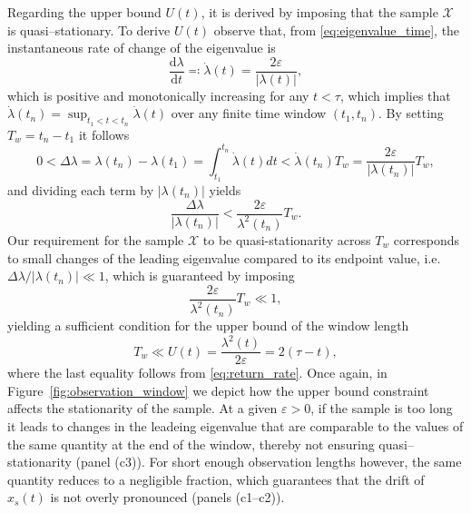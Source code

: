 \documentclass[openacc]{rsproca_new}
\newcommand{\dd}{\mathrm{d}}
\begin{document}
Regarding the upper bound $U(t)$, it is derived by imposing that the sample $\mathcal{X}$ is quasi--stationary.
To derive $U(t)$ observe that, from \eqref{eq:eigenvalue_time}, the instantaneous rate of change of the eigenvalue is
%
\begin{equation*}
  \frac{\dd \lambda}{\dd t} \eqqcolon\dot\lambda(t) = \frac{2\varepsilon}{|\lambda(t)|} ,
\end{equation*}
%
which is positive and monotonically increasing for any $t<\tau$, which implies that $\dot\lambda(t_n)=\sup_{t_1<t<t_n}\dot\lambda(t)$ over any finite time window $(t_1,t_n)$.
By setting $T_{w}=t_n-t_1$ it follows
%
\begin{equation*}
  0<\Delta\lambda = \lambda(t_n) - \lambda(t_1) = \int_{t_1}^{t_n}\dot\lambda(t)dt < \dot\lambda(t_n)T_{w}  = \frac{2 \varepsilon}{|\lambda(t_n)|}T_{w},
\end{equation*}
%
and dividing each term by $|\lambda(t_n)|$ yields
%
\begin{equation*}
  \frac{\Delta\lambda}{|\lambda(t_n)|} < \frac{2 \varepsilon}{\lambda^2(t_n)}T_{w} .
\end{equation*}
%
Our requirement for the sample $\mathcal{X}$ to be quasi-stationarity across $T_{w}$ corresponds to small changes of the leading eigenvalue compared to its endpoint value, i.e. $\Delta\lambda/|\lambda(t_n)|\ll 1$, which is guaranteed by imposing
%
\begin{equation*}
  \frac{2 \varepsilon}{\lambda^2(t_n)}T_{w} \ll 1 ,
\end{equation*}
%
yielding a sufficient condition for the upper bound of the window length
%
\begin{equation}\label{eq:upper_bound}
  T_w\ll U(t) = \frac{\lambda^2(t)}{2 \varepsilon} = 2(\tau - t),
\end{equation}
%
where the last equality follows from \eqref{eq:return_rate}.
Once again, in Figure~\ref{fig:observation_window} we depict how the upper bound constraint affects the stationarity of the sample. 
At a given $\varepsilon>0$, if the sample is too long it leads to changes in the leadeing eigenvalue that are comparable to the values of the same quantity at the end of the window, thereby not ensuring quasi--stationarity (panel (c3)).
For short enough observation lengths however, the same quantity reduces to a negligible fraction, which guarantees that the drift of $x_s(t)$ is not overly pronounced (panels (c1--c2)).
\end{document}
